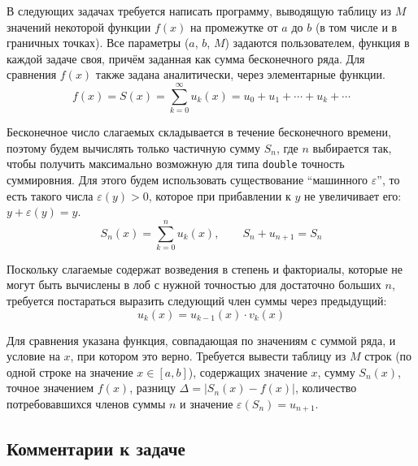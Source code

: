 
В следующих задачах требуется написать программу, выводящую таблицу из $M$
значений некоторой функции $f(x)$ на промежутке от $a$ до $b$ (в том числе и в
граничных точках). Все параметры ($a$, $b$, $M$) задаются пользователем,
функция в каждой задаче своя, причём заданная как сумма бесконечного ряда. Для
сравнения $f(x)$ также задана аналитически, через элементарные функции.
%
\[
  f(x)=S(x)=\sum_{k=0}^\infty u_k(x)=u_0+u_1+\cdots+u_k+\cdots
\]

Бесконечное число слагаемых складывается в течение бесконечного времени,
поэтому будем вычислять только частичную сумму $S_n$, где $n$ выбирается так,
чтобы получить максимально возможную для типа \texttt{double} точность
суммировния. Для этого будем использовать существование ``машинного
$\varepsilon$'', то есть такого числа $\varepsilon(y) > 0$, которое при
прибавлении к $y$ не увеличивает его: $y + \varepsilon(y) = y$.
%
\[
  S_n(x)=\sum_{k=0}^n u_k(x),\qquad S_n + u_{n+1} = S_n
\]

Поскольку слагаемые содержат возведения в степень и факториалы, которые не
могут быть вычислены в лоб с нужной точностью для достаточно больших $n$,
требуется постараться выразить следующий член суммы через предыдущий:
%
\[
u_k(x) = u_{k-1}(x)\cdot v_k(x)
\]

Для сравнения указана функция, совпадающая по значениям с суммой ряда, и
условие на $x$, при котором это верно. Требуется вывести таблицу из $M$ строк
(по одной строке на значение $x \in [a,b]$), содержащих значение $x$, сумму
$S_n(x)$, точное значением $f(x)$, разницу $\Delta = |S_n(x) - f(x)|$,
количество потребовавшихся членов суммы $n$ и значение
$\varepsilon(S_n)=u_{n+1}$.


\subsection*{Комментарии к задаче}



